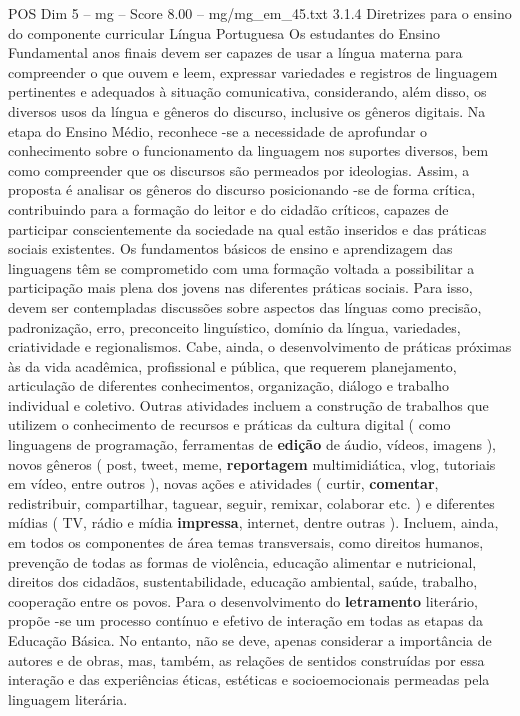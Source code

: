 \begin{textsample}{POS Dim 5 – mg – Score 8.00 – mg/mg\_em\_45.txt}  \label{ex:f5_pos_181}
3.1.4 Diretrizes para o ensino do componente curricular Língua Portuguesa Os estudantes do Ensino Fundamental anos finais devem ser capazes de usar a língua materna para compreender o que ouvem e leem, expressar variedades e registros de linguagem pertinentes e adequados à situação comunicativa, considerando, além disso, os diversos usos da língua e gêneros do discurso, inclusive os gêneros digitais.
Na etapa do Ensino Médio, reconhece -se a necessidade de aprofundar o conhecimento sobre o funcionamento da linguagem nos suportes diversos, bem como compreender que os discursos são permeados por ideologias.
Assim, a proposta é analisar os gêneros do discurso posicionando -se de forma crítica, contribuindo para a formação do leitor e do cidadão críticos, capazes de participar conscientemente da sociedade na qual estão inseridos e das práticas sociais existentes.
Os fundamentos básicos de ensino e aprendizagem das linguagens têm se comprometido com uma formação voltada a possibilitar a participação mais plena dos jovens nas diferentes práticas sociais.
Para isso, devem ser contempladas discussões sobre aspectos das línguas como precisão, padronização, erro, preconceito linguístico, domínio da língua, variedades, criatividade e regionalismos.
Cabe, ainda, o desenvolvimento de práticas próximas às da vida acadêmica, profissional e pública, que requerem planejamento, articulação de diferentes conhecimentos, organização, diálogo e trabalho individual e coletivo.
Outras atividades incluem a construção de trabalhos que utilizem o conhecimento de recursos e práticas da cultura digital ( como linguagens de programação, ferramentas de \textbf{edição} de áudio, vídeos, imagens ), novos gêneros ( post, tweet, meme, \textbf{reportagem} multimidiática, vlog, tutoriais em vídeo, entre outros ), novas ações e atividades ( curtir, \textbf{comentar}, redistribuir, compartilhar, taguear, seguir, remixar, colaborar etc. ) e diferentes mídias ( TV, rádio e mídia \textbf{impressa}, internet, dentre outras ).
Incluem, ainda, em todos os componentes de área temas transversais, como direitos humanos, prevenção de todas as formas de violência, educação alimentar e nutricional, direitos dos cidadãos, sustentabilidade, educação ambiental, saúde, trabalho, cooperação entre os povos.
Para o desenvolvimento do \textbf{letramento} literário, propõe -se um processo contínuo e efetivo de interação em todas as etapas da Educação Básica.
No entanto, não se deve, apenas considerar a importância de autores e de obras, mas, também, as relações de sentidos construídas por essa interação e das experiências éticas, estéticas e socioemocionais permeadas pela linguagem literária.

\end{textsample}
